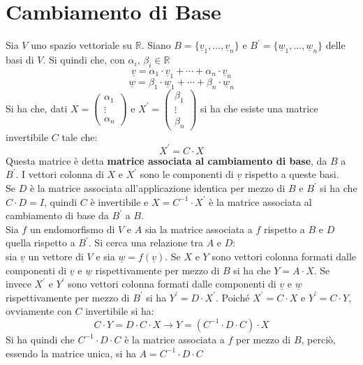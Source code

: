 \documentclass[a4paper,12pt, oneside]{book}
\begin{document}
\section{Cambiamento di Base}
Sia $V$ uno spazio vettoriale su $\mathbb{R}$. Siano $B=\{\underline{v}_1,...,\underline{v}_n\}$ e $B^{'}=\{\underline{w}_1,...,\underline{w}_n\}$ delle basi di $V$. Si quindi che, con $\alpha_i,\,\beta_i\in\mathbb{R}$
$$\underline{v}=\alpha_1\cdot \underline{v}_1+\cdots+\alpha_n\cdot \underline{v}_n$$
$$\underline{w}=\beta_1\cdot \underline{w}_1+\cdots+\beta_n\cdot \underline{w}_n$$
Si ha che, dati $
X=\left(\begin{matrix}
\alpha_1\\
\vdots\\
\alpha_n
\end{matrix}\right)
$ e $X^{'}=\left(\begin{matrix}
\beta_1\\
\vdots\\
\beta_n
\end{matrix}\right)
$ si ha che esiste una matrice invertibile $C$ tale che:
$$X^{'}=C\cdot X$$
Questa matrice è detta \textbf{matrice associata al cambiamento di base}, da $B$ a $B^{'}$. I vettori colonna di $X$ e $X^{'}$ sono le componenti di $\underline{v}$ rispetto a queste basi.\\
Se $D$ è la matrice associata all'applicazione identica per mezzo di $B$ e $B^{'}$ si ha che $C\cdot D=I$, quindi $C$ è invertibile e $X=C^{-1}\cdot X^{'}$ è la matrice associata al cambiamento di base da $B^{'}$ a $B$.\\
Sia $f$ un endomorfismo di $V$ e $A$ sia la matrice associata a $f$ rispetto a $B$ e $D$ quella rispetto a $B^{'}$. Si cerca una relazione tra $A$ e $D$:\\
sia $\underline{v}$ un vettore di $V$ e sia $\underline{w}=f(\underline{v})$. Se $X$ e $Y$ sono vettori colonna formati dalle componenti di $\underline{v}$ e $\underline{w}$ rispettivamente per mezzo di $B$ si ha che $Y=A\cdot X$.
\newpage
Se invece $X^{'}$ e $Y^{'}$ sono vettori colonna formati dalle componenti di $\underline{v}$ e $\underline{w}$ rispettivamente per mezzo di $B^{'}$ si ha $Y^{'}=D\cdot X^{'}$. Poiché $X^{'}=C\cdot X$ e $Y^{'}=C\cdot Y$, ovviamente con $C$ invertibile si ha:
$$C\cdot Y=D\cdot C\cdot X\longrightarrow Y=(C^{-1}\cdot D\cdot C)\cdot X$$
Si ha quindi che $C^{-1}\cdot D\cdot C$ è la matrice associata a $f$ per mezzo di $B$, perciò, essendo la matrice unica, si ha $A=C^{-1}\cdot D\cdot C$
\end{document}
